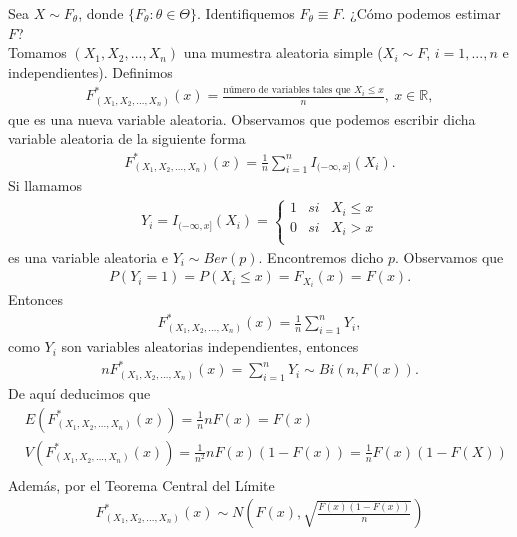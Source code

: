 Sea $X \sim F_{\theta}$, donde $\{F_{\theta} : \theta \in \Theta \}$.  Identifiquemos $F_{\theta} \equiv F$. ¿Cómo podemos estimar $F$?
\\
\newline
Tomamos $(X_1, X_2,..., X_n)$ una mumestra aleatoria simple ($X_i \sim F$, $i = 1,...,n$ e independientes). Definimos
\begin{align*}
    F_{(X_1, X_2,..., X_n)}^*(x) = \frac{\text{número de variables tales que } X_i \leq x}{n}, \ x \in \mathbb{R},
\end{align*}
que es una nueva variable aleatoria. Observamos que podemos escribir dicha variable aleatoria de la siguiente forma
\begin{align*}
    F_{(X_1, X_2,..., X_n)}^*(x) = \frac{1}{n}\sum_{i=1}^{n}{I_{(-\infty,x]}(X_i)}.
\end{align*}
Si llamamos
\begin{align*}
    Y_i = I_{(-\infty,x]}(X_i) = \left\{ \begin{array}{lcc}
             1 & si & X_i \leq x \\
             0 & si & X_i > x\\
             \end{array}
        \right.
\end{align*}
es una variable aleatoria e $Y_i \sim Ber(p)$. Encontremos dicho $p$. Observamos que
\begin{align*}
    P(Y_i = 1) = P(X_i \leq x) = F_{X_i}(x) = F(x).
\end{align*}
Entonces
\begin{align*}
    F_{(X_1, X_2,..., X_n)}^*(x) = \frac{1}{n}\sum_{i=1}^{n}{Y_i},
\end{align*}
como $Y_i$ son variables aleatorias independientes, entonces
\begin{align*}
    nF_{(X_1, X_2,..., X_n)}^*(x) = \sum_{i=1}^{n}{Y_i} \sim Bi(n, F(x)).
\end{align*}
De aquí deducimos que
\begin{align*}
    &E(F_{(X_1, X_2,..., X_n)}^*(x)) = \frac{1}{n}nF(x) = F(x) \\
    &V(F_{(X_1, X_2,..., X_n)}^*(x)) = \frac{1}{n^2}nF(x)(1 - F(x)) = \frac{1}{n}F(x)(1 - F(X)) \\
\end{align*}
Además, por el Teorema Central del Límite
\begin{align*}
    F_{(X_1, X_2,..., X_n)}^*(x) \sim N\left( F(x), \sqrt{\frac{F(x)(1 - F(x))}{n}}\right)
\end{align*}

